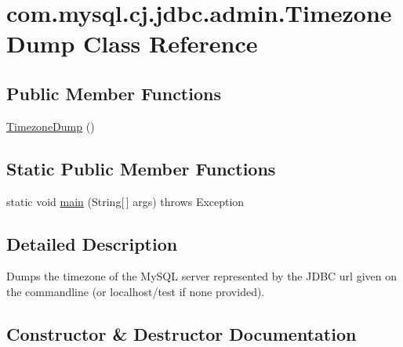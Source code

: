 \hypertarget{classcom_1_1mysql_1_1cj_1_1jdbc_1_1admin_1_1_timezone_dump}{}\section{com.\+mysql.\+cj.\+jdbc.\+admin.\+Timezone\+Dump Class Reference}
\label{classcom_1_1mysql_1_1cj_1_1jdbc_1_1admin_1_1_timezone_dump}
\subsection*{Public Member Functions}
\begin{DoxyCompactItemize}
\item 
\mbox{\hyperlink{classcom_1_1mysql_1_1cj_1_1jdbc_1_1admin_1_1_timezone_dump_aad5a13356198c2aa5866deb7fa51a643}{Timezone\+Dump}} ()
\end{DoxyCompactItemize}
\subsection*{Static Public Member Functions}
\begin{DoxyCompactItemize}
\item 
static void \mbox{\hyperlink{classcom_1_1mysql_1_1cj_1_1jdbc_1_1admin_1_1_timezone_dump_a49fa078091ac273b24d35f0077227ab4}{main}} (String\mbox{[}$\,$\mbox{]} args)  throws Exception 
\end{DoxyCompactItemize}


\subsection{Detailed Description}
Dumps the timezone of the My\+S\+QL server represented by the J\+D\+BC url given on the commandline (or localhost/test if none provided). 

\subsection{Constructor \& Destructor Documentation}
\mbox{\label{classcom_1_1mysql_1_1cj_1_1jdbc_1_1admin_1_1_timezone_dump_aad5a13356198c2aa5866deb7fa51a643}} 
